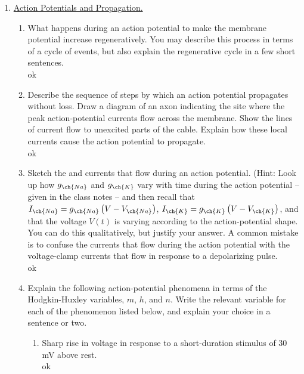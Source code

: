 \documentclass[11pt]{article}
\begin{document}
\begin{enumerate}[label=\arabic*.]
\newpage
\item
\underline{Action Potentials and Propagation.}
\begin{enumerate}[label=(\alph*)]
\item
What happens during an action potential to make the membrane potential increase regeneratively. You may describe this process in terms of a cycle of events, but also explain the regenerative cycle in a few short sentences.
\vspace*{1\baselineskip}
\\
ok







\vspace*{1\baselineskip}
\item
Describe the sequence of steps by which an action potential propagates without loss. Draw a diagram of an axon indicating the site where the peak action-potential currents flow across the membrane. Show the lines of current flow to unexcited parts of the cable. Explain how these local currents cause the action potential to propagate.
\vspace*{1\baselineskip}
\\
ok









\vspace*{1\baselineskip}
\item
Sketch the  and  currents that flow during an action potential. (Hint: Look up how $g_{\ch{Na}}$ and $g_{\ch{K}}$ vary with time during the action potential -- given in the class notes -- and then recall that $I_{\ch{Na}} = g_{\ch{Na}} \left(V - V_{\ch{Na}}\right)$, $I_{\ch{K}} = g_{\ch{K}} \left(V - V_{\ch{K}}\right)$, and that the voltage $V(t)$ is varying according to the action-potential shape. You can do this qualitatively, but justify your answer. A common mistake is to confuse the currents that flow during the action potential with the voltage-clamp currents that flow in response to a depolarizing pulse.
\vspace*{1\baselineskip}
\\
ok








\vspace*{1\baselineskip}
\item
Explain the following action-potential phenomena in terms of the Hodgkin-Huxley variables, $m$, $h$, and $n$. Write the relevant variable for each of the phenomenon listed below, and explain your choice in a sentence or two.
\begin{enumerate}[label=(\roman*)]
\item
Sharp rise in voltage in response to a short-duration stimulus of $30$ mV above rest.
\vspace*{1\baselineskip}
\\
ok






\end{enumerate}
\end{enumerate}
\end{enumerate}
\end{document}
